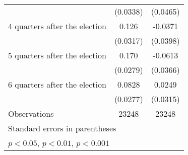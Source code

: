 \begin{table}[htbp]
\begin{tabular}{l*{2}{c}}
                    &    (0.0338)         &    (0.0465)         \\
[1em]
 4 quarters after the election&       0.126\sym{***}&     -0.0371         \\
                    &    (0.0317)         &    (0.0398)         \\
[1em]
 5 quarters after the election&       0.170\sym{***}&     -0.0613         \\
                    &    (0.0279)         &    (0.0366)         \\
[1em]
 6 quarters after the election&      0.0828\sym{**} &      0.0249         \\
                    &    (0.0277)         &    (0.0315)         \\
\hline
Observations        &       23248         &       23248         \\
\hline\hline
\multicolumn{3}{l}{\footnotesize Standard errors in parentheses}\\
\multicolumn{3}{l}{\footnotesize \sym{*} \(p<0.05\), \sym{**} \(p<0.01\), \sym{***} \(p<0.001\)}\\
\end{tabular}
\end{table}
